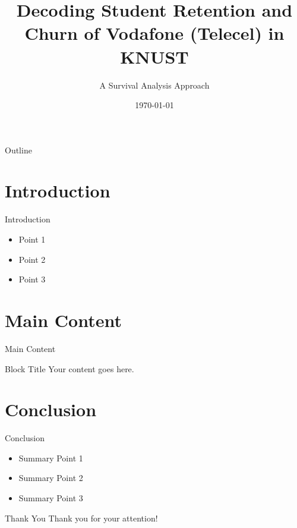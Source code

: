 \documentclass{beamer}
\title{Decoding Student Retention and Churn of Vodafone (Telecel) in KNUST}
\subtitle{A Survival Analysis Approach}
\date{\today}
\begin{document}
\begin{frame}
    \titlepage
\end{frame}

\begin{frame}{Outline}
    \tableofcontents
\end{frame}

\section{Introduction}
\begin{frame}{Introduction}
    \begin{itemize}
        \item Point 1
        \item Point 2
        \item Point 3
    \end{itemize}
\end{frame}

\section{Main Content}
\begin{frame}{Main Content}
    \begin{block}{Block Title}
        Your content goes here.
    \end{block}
\end{frame}

\section{Conclusion}
\begin{frame}{Conclusion}
    \begin{itemize}
        \item Summary Point 1
        \item Summary Point 2
        \item Summary Point 3
    \end{itemize}
\end{frame}

\begin{frame}{Thank You}
    \centering
    Thank you for your attention!
\end{frame}
\end{document}
